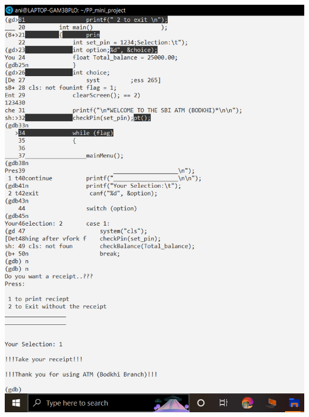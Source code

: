 \documentclass{article}
\begin{document}
\includegraphics[scale=0.35]{debugging3.png}   \\ \\
\end{document}
